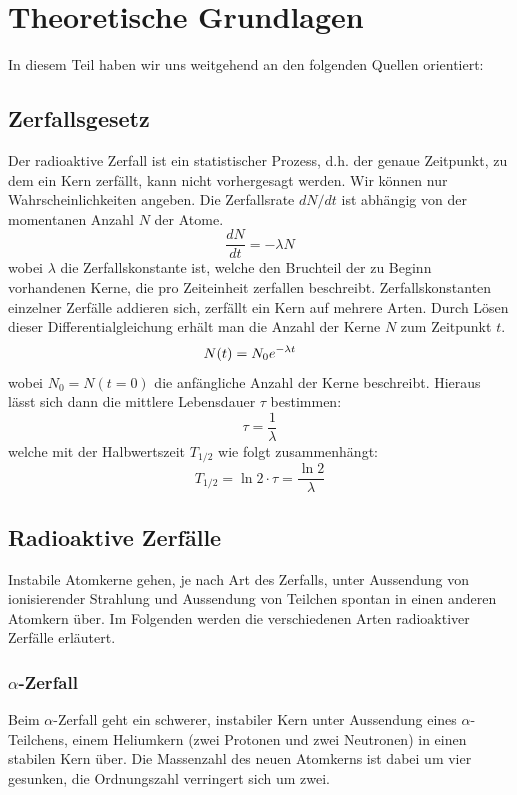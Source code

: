 \documentclass[12pt]{article}
\begin{document}
\newpage
\section[Theoretische Grundlagen]{Theoretische Grundlagen}
In diesem Teil haben wir uns weitgehend an den folgenden Quellen orientiert: \cite{anleitung} \cite{nuclear}
\subsection{Zerfallsgesetz}\label{zerfallsgesetz}
Der radioaktive Zerfall ist ein statistischer Prozess, d.h. der genaue Zeitpunkt, zu dem ein Kern zerfällt, kann nicht vorhergesagt werden. Wir können nur Wahrscheinlichkeiten angeben. Die Zerfallsrate $dN/dt$ ist abhängig von der momentanen Anzahl $N$ der Atome.
\[\frac{dN}{dt}=-\lambda N\]
wobei $\lambda$ die Zerfallskonstante ist, welche den Bruchteil der zu Beginn vorhandenen Kerne, die pro Zeiteinheit zerfallen beschreibt. Zerfallskonstanten einzelner Zerfälle addieren sich, zerfällt ein Kern auf mehrere Arten. Durch Lösen dieser Differentialgleichung erhält man die Anzahl der Kerne $N$ zum Zeitpunkt $t$.
\[N(t)=N_0e^{-\lambda t}\hspace{0.5cm}\]
wobei $N_0=N(t=0)$ die anfängliche Anzahl der Kerne beschreibt. Hieraus lässt sich dann die mittlere Lebensdauer $\tau$ bestimmen:
\[\tau=\frac{1}{\lambda}\]
welche mit der Halbwertszeit $T_{1/2}$ wie folgt zusammenhängt:
\[T_{1/2} = \ln2\cdot \tau = \frac{\ln2}{\lambda}\]
\subsection{Radioaktive Zerfälle}
Instabile Atomkerne gehen, je nach Art des Zerfalls, unter Aussendung von ionisierender Strahlung und Aussendung von Teilchen spontan in einen anderen Atomkern über. Im Folgenden werden die verschiedenen Arten radioaktiver Zerfälle erläutert.
\subsubsection{$\alpha$-Zerfall}
Beim $\alpha$-Zerfall geht ein schwerer, instabiler Kern unter Aussendung eines $\alpha$-Teilchens, einem Heliumkern (zwei Protonen und zwei Neutronen) in einen stabilen Kern über. Die Massenzahl des neuen Atomkerns ist dabei um vier gesunken, die Ordnungszahl verringert sich um zwei.
\end{document}
